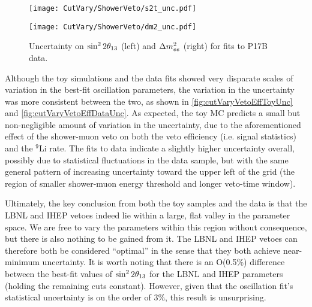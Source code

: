 \documentclass[../thesis.tex]{subfiles}
\begin{document}
\begin{figure}[ht]
  \begin{minipage}{0.5\linewidth}%
    \texttt{[image: CutVary/ShowerVeto/s2t\_unc.pdf]}%
  \end{minipage}%
  \begin{minipage}{0.5\linewidth}%
    \texttt{[image: CutVary/ShowerVeto/dm2\_unc.pdf]}%
  \end{minipage}%
  \caption{Uncertainty on $\sin^2 2\theta_{13}$ (left) and $\Delta m^2_{ee}$ (right) for fits to P17B data.}
  \label{fig:cutVaryVetoEffDataUnc}
\end{figure}

Although the toy simulations and the data fits showed very disparate scales of variation in the best-fit oscillation parameters, the variation in the uncertainty was more consistent between the two, as shown in \autoref{fig:cutVaryVetoEffToyUnc} and \autoref{fig:cutVaryVetoEffDataUnc}. As expected, the toy MC predicts a small but non-negligible amount of variation in the uncertainty, due to the aforementioned effect of the shower-muon veto on both the veto efficiency (i.e. signal statistics) and the $^9$Li rate. The fits to data indicate a slightly higher uncertainty overall, possibly due to statistical fluctuations in the data sample, but with the same general pattern of increasing uncertainty toward the upper left of the grid (the region of smaller shower-muon energy threshold and longer veto-time window).

Ultimately, the key conclusion from both the toy samples and the data is that the LBNL and IHEP vetoes indeed lie within a large, flat valley in the parameter space. We are free to vary the parameters within this region without consequence, but there is also nothing to be gained from it. The LBNL and IHEP vetoes can therefore both be considered ``optimal'' in the sense that they both achieve near-minimum uncertainty. It is worth noting that there is an O(0.5\%) difference between the best-fit values of $\sin^2 2\theta_{13}$ for the LBNL and IHEP parameters (holding the remaining cuts constant). However, given that the oscillation fit's statistical uncertainty is on the order of 3\%, this result is unsurprising.

\begin{comment}
XXX We'd hope that both the LBNL and IHEP points give closer results. We'll see when we regenerate. Ideally, we see that the LBNL and IHEP points both lie within a large region of minimally varying best-fit $\SinSq$. Curious about the effects of using BCW binning. We should do both, so 14x14x2 = 392 sel/fits.
\end{comment}
\end{document}
